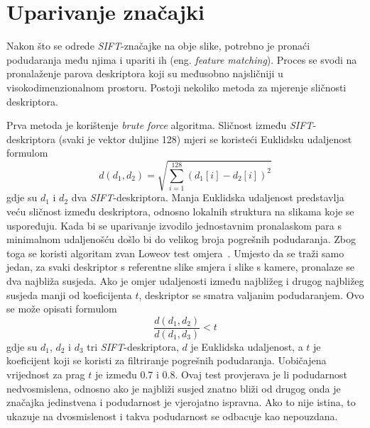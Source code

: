 \section{Uparivanje značajki}

Nakon što se odrede \textit{SIFT}-značajke na obje slike, potrebno je pronaći podudaranja među njima i upariti ih (eng. \textit{feature matching}). Proces se svodi na pronalaženje parova deskriptora koji su međusobno najsličniji u visokodimenzionalnom prostoru. Postoji nekoliko metoda za mjerenje sličnosti deskriptora.

Prva metoda je korištenje \textit{brute force} algoritma. Sličnost između \textit{SIFT}-deskriptora (svaki je vektor duljine 128) mjeri se koristeći Euklidsku udaljenost formulom
\begin{equation}
    d(d_1, d_2) = \sqrt{\sum_{i=1}^{128} (d_1[i] - d_2[i])^2}
\end{equation}
gdje su $d_1$ i $d_2$ dva \textit{SIFT}-deskriptora. Manja Euklidska udaljenost predstavlja veću sličnost između deskriptora, odnosno lokalnih struktura na slikama koje se uspoređuju.
Kada bi se uparivanje izvodilo jednostavnim pronalaskom para s minimalnom udaljenošću došlo bi do velikog broja pogrešnih podudaranja. Zbog toga se koristi algoritam zvan Loweov test omjera~\cite{lowe2004sift}. Umjesto da se traži samo jedan, za svaki deskriptor s referentne slike smjera i slike s kamere, pronalaze se dva najbliža susjeda. Ako je omjer udaljenosti između najbližeg i drugog najbližeg susjeda manji od koeficijenta $t$, deskriptor se smatra valjanim podudaranjem. Ovo se može opisati formulom
\begin{equation}
    \frac{d(d_1, d_2)}{d(d_1, d_3)} < t
\end{equation}
gdje su $d_1$, $d_2$ i $d_3$ tri \textit{SIFT}-deskriptora, $d$ je Euklidska udaljenost, a $t$ je koeficijent koji se koristi za filtriranje pogrešnih podudaranja. Uobičajena vrijednost za prag $t$ je između 0.7 i 0.8. Ovaj test provjerava je li podudarnost nedvosmislena, odnosno ako je najbliži susjed znatno bliži od drugog onda je značajka jedinstvena i podudarnost je vjerojatno ispravna. Ako to nije istina, to ukazuje na dvosmislenost i takva podudarnost se odbacuje kao nepouzdana.

